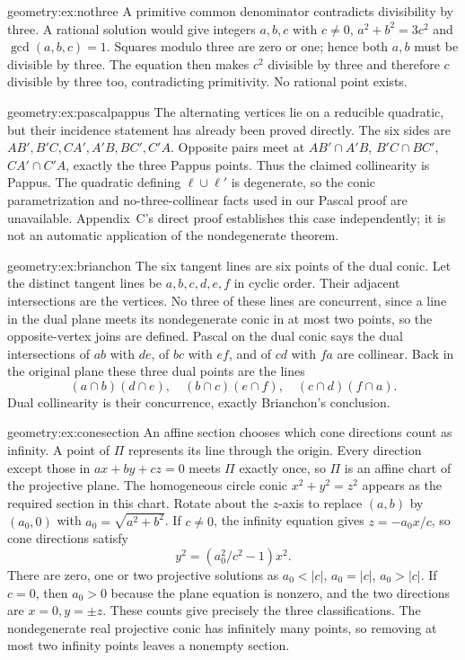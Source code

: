 \begin{solution}{geometry:ex:nothree}
\idea A primitive common denominator contradicts divisibility by three.
\writeup A rational solution would give integers $a,b,c$ with $c\ne0$, $a^2+b^2=3c^2$ and $\gcd(a,b,c)=1$. Squares modulo three are zero or one; hence both $a,b$ must be divisible by three. The equation then makes $c^2$ divisible by three and therefore $c$ divisible by three too, contradicting primitivity. No rational point exists.
\end{solution}
\begin{solution}{geometry:ex:pascalpappus}
\idea The alternating vertices lie on a reducible quadratic, but their incidence statement has already been proved directly.
\writeup The six sides are $AB',B'C,CA',A'B,BC',C'A$. Opposite pairs meet at $AB'\cap A'B$, $B'C\cap BC'$, $CA'\cap C'A$, exactly the three Pappus points. Thus the claimed collinearity is Pappus. The quadratic defining $\ell\cup\ell'$ is degenerate, so the conic parametrization and no-three-collinear facts used in our Pascal proof are unavailable. Appendix~C's direct proof establishes this case independently; it is not an automatic application of the nondegenerate theorem.
\end{solution}
\begin{solution}{geometry:ex:brianchon}
\idea The six tangent lines are six points of the dual conic.
\writeup Let the distinct tangent lines be $a,b,c,d,e,f$ in cyclic order. Their adjacent intersections are the vertices. No three of these lines are concurrent, since a line in the dual plane meets its nondegenerate conic in at most two points, so the opposite-vertex joins are defined. Pascal on the dual conic says the dual intersections of $ab$ with $de$, of $bc$ with $ef$, and of $cd$ with $fa$ are collinear. Back in the original plane these three dual points are the lines
\[
(a\cap b)(d\cap e),\quad(b\cap c)(e\cap f),\quad(c\cap d)(f\cap a).
\]
Dual collinearity is their concurrence, exactly Brianchon's conclusion.
\end{solution}
\begin{solution}{geometry:ex:conesection}
\idea An affine section chooses which cone directions count as infinity.
\writeup A point of $\Pi$ represents its line through the origin. Every direction except those in $ax+by+cz=0$ meets $\Pi$ exactly once, so $\Pi$ is an affine chart of the projective plane. The homogeneous circle conic $x^2+y^2=z^2$ appears as the required section in this chart. Rotate about the $z$-axis to replace $(a,b)$ by $(a_0,0)$ with $a_0=\sqrt{a^2+b^2}$. If $c\ne0$, the infinity equation gives $z=-a_0x/c$, so cone directions satisfy
\[
y^2=(a_0^2/c^2-1)x^2.
\]
There are zero, one or two projective solutions as $a_0<|c|$, $a_0=|c|$, $a_0>|c|$. If $c=0$, then $a_0>0$ because the plane equation is nonzero, and the two directions are $x=0,y=\pm z$. These counts give precisely the three classifications. The nondegenerate real projective conic has infinitely many points, so removing at most two infinity points leaves a nonempty section.
\end{solution}

